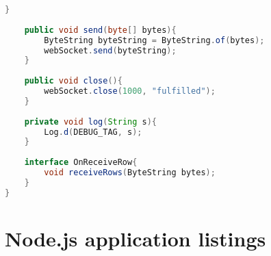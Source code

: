 \documentclass[hidelinks,11pt,a4paper,oneside,article]{memoir}
\begin{document}
\begin{lstlisting}[label={listing:websocketconnection},caption={WebsocketConnection class, makes a websocket connection},language=Java, style=styleprogrammingappendix]
    }
    
    public void send(byte[] bytes){
        ByteString byteString = ByteString.of(bytes);
        webSocket.send(byteString);
    }
    
    public void close(){
        webSocket.close(1000, "fulfilled");
    }
    
    private void log(String s){
        Log.d(DEBUG_TAG, s);
    }
    
    interface OnReceiveRow{
        void receiveRows(ByteString bytes);
    }
}
\end{lstlisting}\vspace{14pt}

\clearpage
{}

\chapter{Node.js application listings}\label{appx:nodejsapp}
\end{document}
